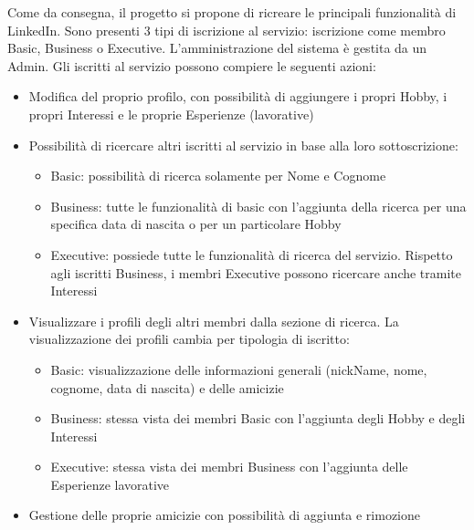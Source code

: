 Come da consegna, il progetto si propone di ricreare le principali
funzionalit\`a di LinkedIn. Sono presenti 3 tipi di iscrizione al servizio:
iscrizione come membro Basic, Business o Executive. L'amministrazione del
sistema \`e gestita da un Admin. Gli iscritti al servizio possono compiere
le seguenti azioni:
\begin{itemize}

\item Modifica del proprio profilo, con possibilit\`a di aggiungere
  i propri Hobby, i propri Interessi e le proprie Esperienze (lavorative)

\item Possibilit\`a di ricercare altri iscritti al servizio in base alla
  loro sottoscrizione:
  \begin{itemize}
    
  \item Basic: possibilit\`a di ricerca solamente per Nome e Cognome
  \item Business: tutte le funzionalit\`a di basic con l'aggiunta
    della ricerca per una specifica data di nascita o per un particolare
    Hobby
  \item Executive: possiede tutte le funzionalit\`a di ricerca del
    servizio. Rispetto agli iscritti Business, i membri Executive possono
    ricercare anche tramite Interessi

  \end{itemize}

\item Visualizzare i profili degli altri membri dalla sezione di ricerca.
  La visualizzazione dei profili cambia per tipologia di iscritto:
  \begin{itemize}

  \item Basic: visualizzazione delle informazioni generali (nickName,
    nome, cognome, data di nascita) e delle amicizie
  \item Business: stessa vista dei membri Basic con l'aggiunta
    degli Hobby e degli Interessi
  \item Executive: stessa vista dei membri Business con l'aggiunta
    delle Esperienze lavorative

  \end{itemize}

\item Gestione delle proprie amicizie con possibilit\`a di aggiunta e
  rimozione
  
\end{itemize}

